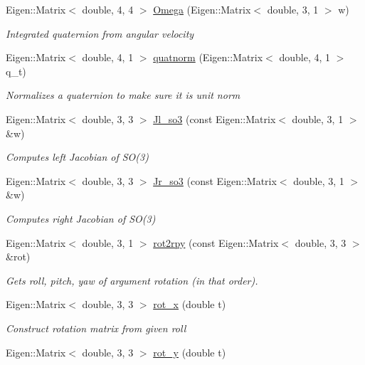 \begin{DoxyCompactItemize}
Eigen\+::\+Matrix$<$ double, 4, 4 $>$ \hyperlink{namespaceov__core_a03115c09fd2fa8a6af23830b9230a683}{Omega} (Eigen\+::\+Matrix$<$ double, 3, 1 $>$ w)
\begin{DoxyCompactList}\small\item\em Integrated quaternion from angular velocity \end{DoxyCompactList}\item 
Eigen\+::\+Matrix$<$ double, 4, 1 $>$ \hyperlink{namespaceov__core_a6c4586cceb6f81771921e61e135dcaed}{quatnorm} (Eigen\+::\+Matrix$<$ double, 4, 1 $>$ q\+\_\+t)
\begin{DoxyCompactList}\small\item\em Normalizes a quaternion to make sure it is unit norm \end{DoxyCompactList}\item 
Eigen\+::\+Matrix$<$ double, 3, 3 $>$ \hyperlink{namespaceov__core_a518b7324a4106ccad60558e2e5c4b14f}{Jl\+\_\+so3} (const Eigen\+::\+Matrix$<$ double, 3, 1 $>$ \&w)
\begin{DoxyCompactList}\small\item\em Computes left Jacobian of S\+O(3) \end{DoxyCompactList}\item 
Eigen\+::\+Matrix$<$ double, 3, 3 $>$ \hyperlink{namespaceov__core_a0406d085d6175d3bc8a539328ec214b5}{Jr\+\_\+so3} (const Eigen\+::\+Matrix$<$ double, 3, 1 $>$ \&w)
\begin{DoxyCompactList}\small\item\em Computes right Jacobian of S\+O(3) \end{DoxyCompactList}\item 
Eigen\+::\+Matrix$<$ double, 3, 1 $>$ \hyperlink{namespaceov__core_af608ab8e3f8cd8554ade192cd804b7ce}{rot2rpy} (const Eigen\+::\+Matrix$<$ double, 3, 3 $>$ \&rot)
\begin{DoxyCompactList}\small\item\em Gets roll, pitch, yaw of argument rotation (in that order). \end{DoxyCompactList}\item 
Eigen\+::\+Matrix$<$ double, 3, 3 $>$ \hyperlink{namespaceov__core_ab3268e0844642c119fe45c2880afb581}{rot\+\_\+x} (double t)
\begin{DoxyCompactList}\small\item\em Construct rotation matrix from given roll \end{DoxyCompactList}\item 
Eigen\+::\+Matrix$<$ double, 3, 3 $>$ \hyperlink{namespaceov__core_a2a212d931b6f4325052b3169ad6161a3}{rot\+\_\+y} (double t)

\end{DoxyCompactItemize}
